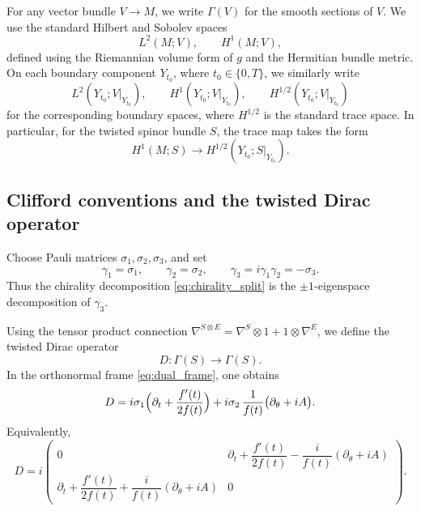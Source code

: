 \documentclass[11pt]{article}
\theoremstyle{definition}
\numberwithin{equation}{section}
\begin{document}
For any vector bundle \(V\to M\), we write \(\Gamma(V)\) for the smooth sections of \(V\). We use the standard Hilbert and Sobolev spaces
\begin{equation}\label{eq:bulk_spaces}
L^2(M;V),
\qquad
H^1(M;V),
\end{equation}
defined using the Riemannian volume form of \(g\) and the Hermitian bundle metric. On each boundary component \(Y_{t_0}\), where \(t_0\in\{0,T\}\), we similarly write
\begin{equation}\label{eq:boundary_spaces}
L^2(Y_{t_0};V|_{Y_{t_0}}),
\qquad
H^1(Y_{t_0};V|_{Y_{t_0}}),
\qquad
H^{1/2}(Y_{t_0};V|_{Y_{t_0}})
\end{equation}
for the corresponding boundary spaces, where \(H^{1/2}\) is the standard trace space. In particular, for the twisted spinor bundle \(S\), the trace map takes the form
\begin{equation}\label{eq:trace_map}
H^1(M;S)\longrightarrow H^{1/2}(Y_{t_0};S|_{Y_{t_0}}).
\end{equation}

\subsection{Clifford conventions and the twisted Dirac operator}

Choose Pauli matrices \(\sigma_1,\sigma_2,\sigma_3\), and set
\begin{equation}\label{eq:gamma_def}
\gamma_1=\sigma_1,
\qquad
\gamma_2=\sigma_2,
\qquad
\gamma_3=i\gamma_1\gamma_2=-\sigma_3.
\end{equation}
Thus the chirality decomposition \eqref{eq:chirality_split} is the \(\pm1\)-eigenspace decomposition of \(\gamma_3\).

Using the tensor product connection $
\nabla^{S\otimes E}=\nabla^S\otimes 1 + 1\otimes \nabla^E$, we define the twisted Dirac operator
\begin{equation}\label{eq:Dirac_def}
D:\Gamma(S)\longrightarrow \Gamma(S).
\end{equation}
In the orthonormal frame \eqref{eq:dual_frame}, one obtains
\begin{equation}\label{eq:Dexplicit}
D
=
i\sigma_1\Bigl(\partial_t+\frac{f'(t)}{2f(t)}\Bigr)
+
i\sigma_2\,\frac{1}{f(t)}\bigl(\partial_\theta+iA\bigr).
\end{equation}
Equivalently,
\begin{equation}\label{eq:Dmatrix}
D
=
i
\begin{pmatrix}
0 &
\partial_t+\dfrac{f'(t)}{2f(t)}-\dfrac{i}{f(t)}(\partial_\theta+iA)
\\
\partial_t+\dfrac{f'(t)}{2f(t)}+\dfrac{i}{f(t)}(\partial_\theta+iA)
&
0
\end{pmatrix}.
\end{equation}
\end{document}
